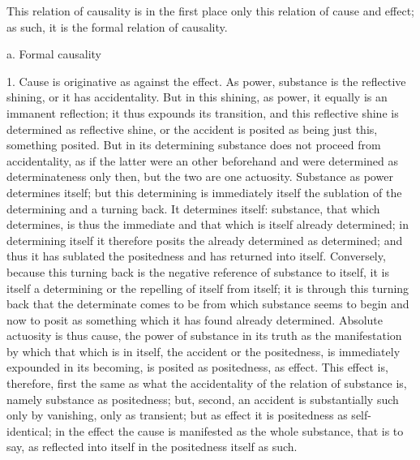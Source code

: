 This relation of causality is in the first place
only this relation of cause and effect;
as such, it is the formal relation of causality.

a. Formal causality

1. Cause is originative as against the effect.
As power, substance is the reflective shining,
or it has accidentality.
But in this shining, as power,
it equally is an immanent reflection;
it thus expounds its transition,
and this reflective shine is
determined as reflective shine,
or the accident is posited
as being just this, something posited.
But in its determining substance
does not proceed from accidentality,
as if the latter were an other beforehand
and were determined as determinateness only then,
but the two are one actuosity.
Substance as power determines itself;
but this determining is immediately itself
the sublation of the determining and a turning back.
It determines itself: substance, that which determines, is
thus the immediate and that which is itself already determined;
in determining itself it therefore posits
the already determined as determined;
and thus it has sublated the
positedness and has returned into itself.
Conversely, because this turning back is
the negative reference of substance to itself,
it is itself a determining
or the repelling of itself from itself;
it is through this turning back that
the determinate comes to be from which
substance seems to begin
and now to posit as something
which it has found already determined.
Absolute actuosity is thus cause,
the power of substance in its truth
as the manifestation by which
that which is in itself,
the accident or the positedness,
is immediately expounded in its becoming,
is posited as positedness, as effect.
This effect is, therefore, first the same as
what the accidentality of the relation
of substance is, namely substance as positedness;
but, second, an accident
is substantially such only by vanishing, only as transient;
but as effect it is positedness as self-identical;
in the effect the cause is manifested as the whole substance,
that is to say, as reflected into itself
in the positedness itself as such.

